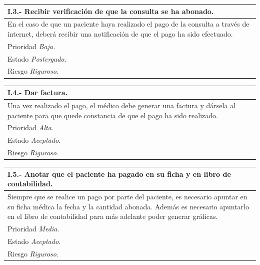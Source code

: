\documentclass[a4paper,oneside,11pt]{book}
\begin{document}
\begin{center}
\begin{tabulary}{15cm}{|L|}
	\hline
		\bf{I.3.- Recibir verificación de que la consulta se ha abonado.} \\
	\hline
		En el caso de que un paciente haya realizado el pago de la consulta a través de internet, deberá recibir una notificación de que el pago ha sido efectuado. \\
	\hline
		Prioridad \textit{Baja.} \\
	\hline
		Estado \textit{Postergado.} \\
	\hline
		Riesgo \textit{Riguroso.} \\
	\hline
\end{tabulary}
\end{center}

\begin{center}
\begin{tabulary}{15cm}{|L|}
	\hline
		\bf{I.4.- Dar factura.} \\
	\hline
		Una vez realizado el pago, el médico debe generar una factura y dársela al paciente para que quede constancia de que el pago ha sido realizado. \\
	\hline
		Prioridad \textit{Alta.} \\
	\hline
		Estado \textit{Aceptado.} \\
	\hline
		Riesgo \textit{Riguroso.} \\
	\hline
\end{tabulary}
\end{center}

\begin{center}
\begin{tabulary}{15cm}{|L|}
	\hline
		\bf{I.5.- Anotar que el paciente ha pagado en su ficha y en libro de contabilidad.} \\
	\hline
		Siempre que se realice un pago por parte del paciente, es necesario apuntar en su ficha médica la fecha y la cantidad abonada. Además es necesario apuntarlo en el libro de contabilidad para más adelante poder generar gráficas. \\
	\hline
		Prioridad \textit{Media.} \\
	\hline
		Estado \textit{Aceptado.} \\
	\hline
		Riesgo \textit{Riguroso.} \\
	\hline
\end{tabulary}
\end{center}
\end{document}
